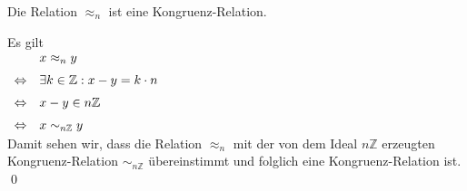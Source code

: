 \begin{Satz}
  Die Relation $\approx_n$ ist eine Kongruenz-Relation.
\end{Satz}

\proof
Es gilt 
\\[0.2cm]
\hspace*{1.3cm}
$
\begin{array}[t]{cl}
                & x \approx_n y                                \\[0.2cm]
\Leftrightarrow & \exists k \in \mathbb{Z}: x - y = k \cdot n  \\[0.2cm]
\Leftrightarrow & x - y \in n\mathbb{Z}                        \\[0.2cm]
\Leftrightarrow & x \sim_{n\mathbb{Z}} y 
\end{array}
$
\\[0.2cm]
Damit sehen wir, dass die Relation $\approx_n$ mit der von dem Ideal $n\mathbb{Z}$
erzeugten Kongruenz-Relation $\sim_{n\mathbb{Z}}$ \"{u}bereinstimmt und folglich
eine Kongruenz-Relation ist.  \qed

